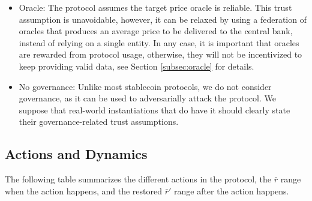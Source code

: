 \documentclass{ifcolog}
\newcommand{\rr}{\bar{r}}
\begin{document}
\begin{itemize}
  \item{Oracle:} The protocol assumes the target price oracle is reliable. This trust assumption is unavoidable, however, 
  it can be relaxed by using a federation of oracles that produces an average price to be delivered to the central bank, 
  instead of relying on a single entity. In any case, it is important that oracles are rewarded from protocol usage, 
  otherwise, they will not be incentivized to keep providing valid data, see Section \ref{subsec:oracle} for details.

  \item{No governance:} Unlike most stablecoin protocols, we do not consider governance, as it can be used to 
  adversarially attack the protocol. We suppose that real-world instantiations that do have it should clearly state their 
  governance-related trust assumptions.
\end{itemize}

\subsection{Actions and Dynamics}
\label{subsec:actions}

The following table summarizes the different actions in the protocol, the $\rr$ range when the action happens, and the restored $\rr'$ range after the action happens.
\end{document}
